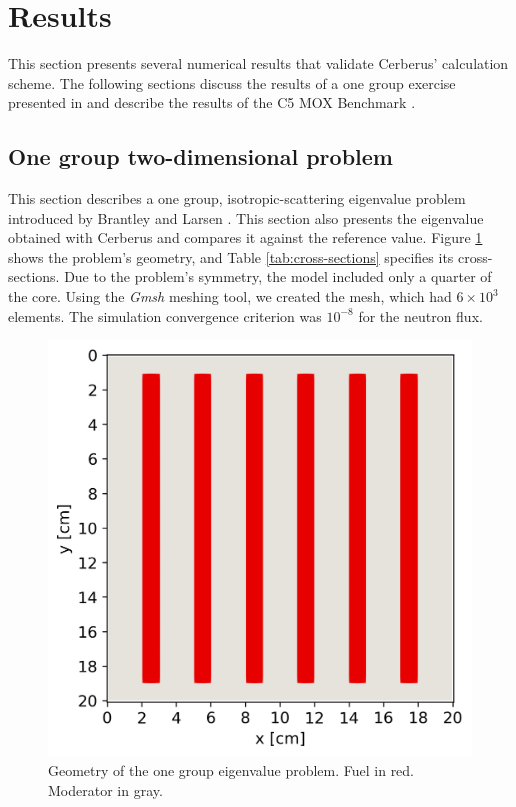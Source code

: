 \documentclass{anstrans}
\begin{document}
\section{Results}

This section presents several numerical results that validate Cerberus' calculation scheme.
The following sections discuss the results of a one group exercise presented in \cite{brantley_simplifiedP3_2000} and describe the results of the C5 MOX Benchmark \cite{cavarec_benchmark_1994}.

\subsection{One group two-dimensional problem}

This section describes a one group, isotropic-scattering eigenvalue problem introduced by Brantley and Larsen \cite{brantley_simplifiedP3_2000}.
This section also presents the eigenvalue obtained with Cerberus and compares it against the reference value.
Figure \ref{fig:2D} shows the problem's geometry, and Table \ref{tab:cross-sections} specifies its cross-sections.
Due to the problem's symmetry, the model included only a quarter of the core.
Using the \textit{Gmsh} \cite{geuzaine_gmsh_2009} meshing tool, we created the mesh, which had $6 \times 10^{3}$ elements.
The simulation convergence criterion was $10^{-8}$ for the neutron flux.

\begin{figure}[H] %
    \centering
    \includegraphics[width=0.75\linewidth]{figures/mesh2.png}
    \hfill
    \caption{Geometry of the one group eigenvalue problem. Fuel in red. Moderator in gray.}
    \label{fig:2D}
\end{figure}
\end{document}
